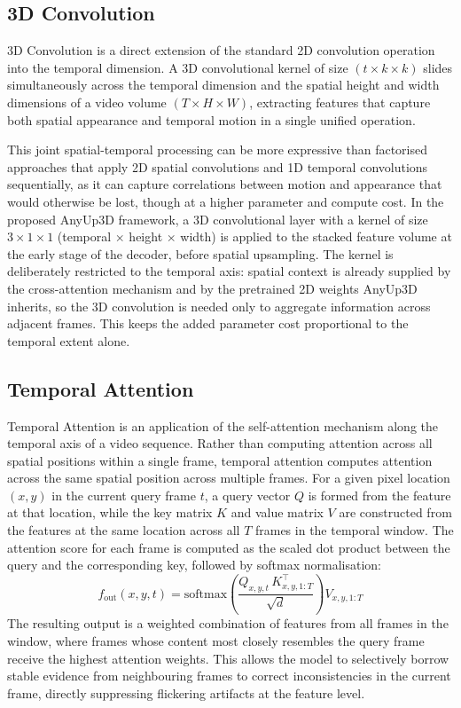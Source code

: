 \subsection{3D Convolution}

3D Convolution is a direct extension of the standard 2D
convolution operation into the temporal dimension.
A 3D convolutional kernel of size $(t \times k \times k)$ slides
simultaneously across the temporal dimension and the spatial
height and width dimensions of a video volume
$(T \times H \times W)$, extracting features that capture both
spatial appearance and temporal motion in a single unified
operation.

This joint spatial-temporal processing can be more expressive
than factorised approaches that apply 2D spatial convolutions
and 1D temporal convolutions sequentially, as it can capture
correlations between motion and appearance that would otherwise
be lost, though at a higher parameter and compute cost.
In the proposed AnyUp3D framework, a 3D convolutional layer
with a kernel of size $3 \times 1 \times 1$ (temporal $\times$
height $\times$ width) is applied to the stacked feature volume
at the early stage of the decoder, before spatial upsampling.
The kernel is deliberately restricted to the temporal axis:
spatial context is already supplied by the cross-attention
mechanism and by the pretrained 2D weights AnyUp3D inherits, so
the 3D convolution is needed only to aggregate information
across adjacent frames.
This keeps the added parameter cost proportional to the temporal
extent alone.

\subsection{Temporal Attention}

Temporal Attention is an application of the self-attention
mechanism along the temporal axis of a video sequence.
Rather than computing attention across all spatial positions
within a single frame, temporal attention computes attention
across the same spatial position across multiple frames.
For a given pixel location $(x, y)$ in the current query frame
$t$, a query vector $Q$ is formed from the feature at that
location, while the key matrix $K$ and value matrix $V$ are
constructed from the features at the same location across all
$T$ frames in the temporal window.
The attention score for each frame is computed as the scaled
dot product between the query and the corresponding key,
followed by softmax normalisation:
\begin{equation}
  f_{\text{out}}(x,y,t)
  = \text{softmax}\!\left(
      \frac{Q_{x,y,t}\, K_{x,y,1:T}^{\top}}{\sqrt{d}}
    \right) V_{x,y,1:T}
  \label{eq:temporal_attention}
\end{equation}
The resulting output is a weighted combination of features from
all frames in the window, where frames whose content most
closely resembles the query frame receive the highest attention
weights.
This allows the model to selectively borrow stable evidence from
neighbouring frames to correct inconsistencies in the current
frame, directly suppressing flickering artifacts at the feature
level.

